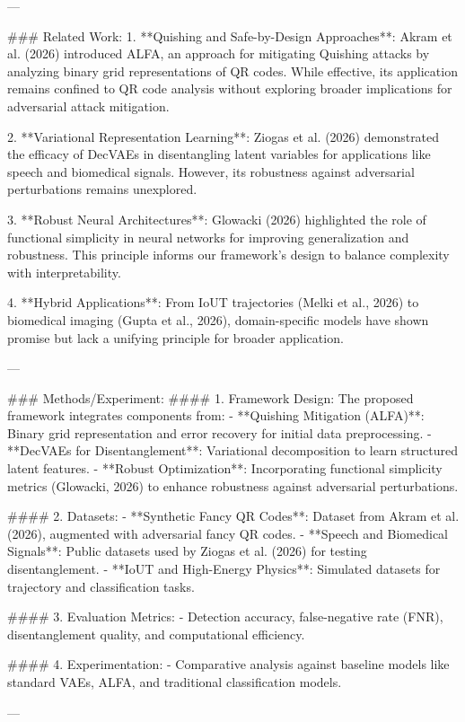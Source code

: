 ---

### Related Work:
1. **Quishing and Safe-by-Design Approaches**: Akram et al. (2026) introduced ALFA, an approach for mitigating Quishing attacks by analyzing binary grid representations of QR codes. While effective, its application remains confined to QR code analysis without exploring broader implications for adversarial attack mitigation.
   
2. **Variational Representation Learning**: Ziogas et al. (2026) demonstrated the efficacy of DecVAEs in disentangling latent variables for applications like speech and biomedical signals. However, its robustness against adversarial perturbations remains unexplored.

3. **Robust Neural Architectures**: Glowacki (2026) highlighted the role of functional simplicity in neural networks for improving generalization and robustness. This principle informs our framework's design to balance complexity with interpretability.

4. **Hybrid Applications**: From IoUT trajectories (Melki et al., 2026) to biomedical imaging (Gupta et al., 2026), domain-specific models have shown promise but lack a unifying principle for broader application.

---

### Methods/Experiment:
#### 1. Framework Design:
The proposed framework integrates components from:
- **Quishing Mitigation (ALFA)**: Binary grid representation and error recovery for initial data preprocessing.
- **DecVAEs for Disentanglement**: Variational decomposition to learn structured latent features.
- **Robust Optimization**: Incorporating functional simplicity metrics (Glowacki, 2026) to enhance robustness against adversarial perturbations.

#### 2. Datasets:
- **Synthetic Fancy QR Codes**: Dataset from Akram et al. (2026), augmented with adversarial fancy QR codes.
- **Speech and Biomedical Signals**: Public datasets used by Ziogas et al. (2026) for testing disentanglement.
- **IoUT and High-Energy Physics**: Simulated datasets for trajectory and classification tasks.

#### 3. Evaluation Metrics:
- Detection accuracy, false-negative rate (FNR), disentanglement quality, and computational efficiency.

#### 4. Experimentation:
- Comparative analysis against baseline models like standard VAEs, ALFA, and traditional classification models.

---

